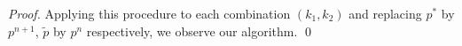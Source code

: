 \begin{proof}




        Applying this procedure to each combination $(k_{1}, k_{2})$ and replacing $p^{\ast}$ by $p^{n+1}$, $\tilde{p}$ by $p^{n}$ respectively, we observe our algorithm.
        \qed
    \end{proof}




